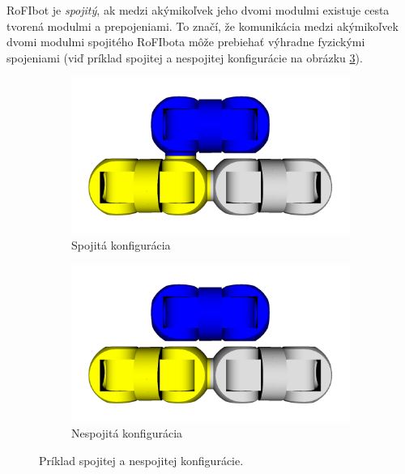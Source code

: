 \documentclass[
  printed, %
  oneside, %
  notable,   %
  nolof,     %
  nolot,     %
]{fithesis3}
\begin{document}
RoFIbot je \textit{spojitý}, ak medzi akýmikoľvek jeho dvomi modulmi existuje cesta tvorená modulmi a prepojeniami. To značí, že komunikácia medzi akýmikoľvek dvomi modulmi spojitého RoFIbota môže prebiehať výhradne fyzickými spojeniami (viď príklad spojitej a nespojitej konfigurácie na obrázku \ref{fig:exampleCfg}). 

\begin{figure}[hbt!]
    \centering
    \begin{subfigure}[b]{0.49\textwidth}
        \includegraphics[width=\textwidth]{pictures/connected_rofibot.png}
        \caption[Spojitá konfigurácia.]{Spojitá konfigurácia}
        \label{fig:connectCfg}
    \end{subfigure}
    \begin{subfigure}[b]{0.49\textwidth}
        \includegraphics[width=\textwidth]{pictures/disconnected_rofibot.png}
        \caption[Nespojitá konfigurácia.]{Nespojitá konfigurácia}
        \label{fig:disconnectCfg}
    \end{subfigure}
    \caption[Príklad konfigurácie]{Príklad spojitej a nespojitej konfigurácie.}
    \label{fig:exampleCfg}
\end{figure}
\end{document}
